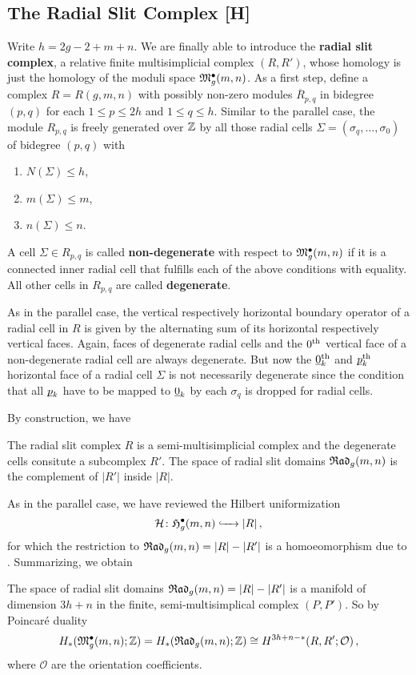 \subsection{The Radial Slit Complex [H]}
\label{cellular_models:radial:bisimplicial_complex}
Write $h = 2 g - 2 + m + n$. 
We are finally able to introduce the \textbf{radial slit complex}, a relative finite multisimplicial complex $(R, R')$, 
whose homology is just the homology of the moduli space $\mathfrak{M}^\bullet_g(m, n)$.
As a first step, define a complex $R = R(g, m, n)$ with possibly non-zero modules $\overline R_{p, q}$ in bidegree $(p, q)$ for each $1 \leq p \leq 2 h$ and $1 \leq q \leq h$.
Similar to the parallel case, the module $R_{p, q}$ is freely generated over $\mathbb Z$ by all those radial cells $\Sigma = (\sigma_q, \dotsc, \sigma_0)$ of bidegree $(p, q)$ with
\begin{enumerate}
\item $N(\Sigma) \leq h$,
\item $m(\Sigma) \leq m$,
\item $n(\Sigma) \leq n$.
\end{enumerate}

A cell $\Sigma \in R_{p, q}$ is called \textbf{non-degenerate} with respect to $\mathfrak{M}^\bullet_g(m, n)$
if it is a connected inner radial cell that fulfills each of the above conditions with equality.
All other cells in $R_{p, q}$ are called \textbf{degenerate}.

As in the parallel case, the vertical respectively horizontal boundary operator of a radial cell in $R$ is given by the alternating sum of its horizontal respectively vertical faces.
Again, faces of degenerate radial cells and the $0^{\text{th}}$ vertical face of a non-degenerate radial cell are always degenerate.
But now the $\underline{\smash{0}}_k^{\text{th}}$ and $\underline{\smash{p}}_k^{\text{th}}$ horizontal face of a radial cell $\Sigma$ is not necessarily degenerate 
since the condition that all $\underline{\smash{p}}_k$ have to be mapped to $\underline{\smash{0}}_k$ by each $\sigma_q$ is dropped for radial cells.

By construction, we have

\begin{thm}
   The radial slit complex $R$ is a semi-multisimplicial complex and the degenerate cells consitute a subcomplex $R'$.
   The space of radial slit domains ${\mathfrak{Rad}_g(m,n)}$ is the complement of $|R'|$ inside $|R|$.
\end{thm}

As in the parallel case, we have reviewed the Hilbert uniformization
\[
   \mathcal H \colon \mathfrak{H}^{\bullet}_g(m, n) \xhookrightarrow{\hspace{6pt}{}\hspace{6pt}} |R| \,,
\]
for which the restriction to ${\mathfrak{Rad}_g(m,n)} = |R| - |R'|$ is a homoeomorphism due to \cite{Boedigheimer2006}.
Summarizing, we obtain
\begin{thm}
   The space of radial slit domains ${\mathfrak{Rad}_g(m,n)} = |R| - |R'|$ is a manifold of dimension $3h + n$ in the finite, semi-multisimplical complex $(P,P')$.
   So by Poincaré duality
    \[
       H_\ast( \mathfrak{M}^\bullet_g(m, n); \mathbb Z ) = H_\ast( {\mathfrak{Rad}_g(m,n)}; \mathbb Z ) \cong H^{3h+n-\ast}( R, R'; \mathcal O)\,,
    \]
    where $\mathcal O$ are the orientation coefficients.
\end{thm}

